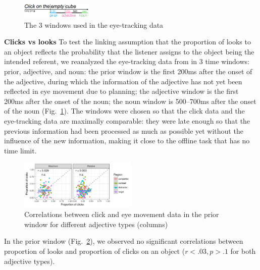 \documentclass[10pt,letterpaper]{article}
\begin{document}


\begin{figure}[ht]
  \centering
  \includegraphics[width=0.3\textwidth]{plots/windows.png}
  \caption{The 3 windows used in the eye-tracking data} 
  \label{fig:windows}
\end{figure}


\noindent \textbf{Clicks vs looks} \quad
To test the linking assumption that the proportion of looks to an object reflects the probability 
 that the listener assigns to the object being the intended referent, 
 we reanalyzed the eye-tracking data from 
 in 3 time windows: prior, adjective, and noun: the prior window is the first 200ms after the onset of the adjective, during which the information of the adjective has not yet been reflected in eye movement due to
 planning; the adjective window is the first 200ms after the onset of the noun; the noun window 
 is 500--700ms after the onset of the noun (Fig.~\ref{fig:windows}).
The windows were chosen so that the click data and the eye-tracking data are maximally comparable: they
 were late enough so that the previous information had been processed as much as possible
 yet without the influence of the new information, making it close to the offline task that has no time limit. 



\begin{figure}[ht]
  \centering
  \includegraphics[width=0.5\textwidth]{plots/prior.png}
  \caption{Correlations between click and eye movement data in the prior window
    for different adjective types (columns)} 
  \label{fig:priorcors}
\end{figure}

In the prior window (Fig.~\ref{fig:priorcors}), we observed no significant correlations between proportion of looks 
and proportion of clicks on an object ($r<.03, p > .1$ for both adjective types).
\end{document}
